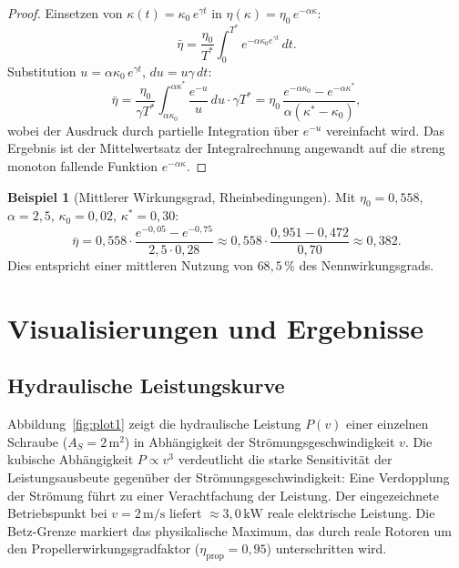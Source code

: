 ﻿\documentclass[a4paper,12pt]{article}
\theoremstyle{definition}
\newtheorem{beispiel}{Beispiel}
\begin{document}
\begin{proof}
Einsetzen von $\kappa(t) = \kappa_0\,e^{\gamma t}$ in $\eta(\kappa) = \eta_0\,e^{-\alpha\kappa}$:
\[
  \bar{\eta} = \frac{\eta_0}{T^*}\int_0^{T^*} e^{-\alpha\kappa_0 e^{\gamma t}}\,dt.
\]
Substitution $u = \alpha\kappa_0\,e^{\gamma t}$, $du = u\gamma\,dt$:
\[
  \bar{\eta} = \frac{\eta_0}{\gamma T^*}\int_{\alpha\kappa_0}^{\alpha\kappa^*}
               \frac{e^{-u}}{u}\,du \cdot \gamma T^*
             = \eta_0\,\frac{e^{-\alpha\kappa_0} - e^{-\alpha\kappa^*}}{\alpha(\kappa^* - \kappa_0)},
\]
wobei der Ausdruck durch partielle Integration über $e^{-u}$ vereinfacht wird.
Das Ergebnis ist der Mittelwertsatz der Integralrechnung angewandt auf die
streng monoton fallende Funktion $e^{-\alpha\kappa}$. \qedhere
\end{proof}

\begin{beispiel}[Mittlerer Wirkungsgrad, Rheinbedingungen]
Mit $\eta_0 = 0{,}558$, $\alpha = 2{,}5$, $\kappa_0 = 0{,}02$, $\kappa^* = 0{,}30$:
\[
  \bar{\eta} = 0{,}558 \cdot \frac{e^{-0{,}05} - e^{-0{,}75}}{2{,}5 \cdot 0{,}28}
             \approx 0{,}558 \cdot \frac{0{,}951 - 0{,}472}{0{,}70}
             \approx 0{,}382.
\]
Dies entspricht einer mittleren Nutzung von $68{,}5\,\%$ des Nennwirkungsgrads.
\end{beispiel}

\section{Visualisierungen und Ergebnisse}

\subsection{Hydraulische Leistungskurve}

Abbildung~\ref{fig:plot1} zeigt die hydraulische Leistung $P(v)$ einer einzelnen
Schraube ($A_S = 2\,\mathrm{m^2}$) in Abhängigkeit der Strömungsgeschwindigkeit $v$.
Die kubische Abhängigkeit $P \propto v^3$ verdeutlicht die starke Sensitivität der
Leistungsausbeute gegenüber der Strömungsgeschwindigkeit: Eine Verdopplung der
Strömung führt zu einer Verachtfachung der Leistung. Der eingezeichnete Betriebspunkt
bei $v = 2\,\mathrm{m/s}$ liefert $\approx 3{,}0\,\mathrm{kW}$ reale elektrische Leistung.
Die Betz-Grenze markiert das physikalische Maximum, das durch reale Rotoren um den
Propellerwirkungsgradfaktor ($\eta_{\mathrm{prop}} = 0{,}95$) unterschritten wird.
\end{document}
